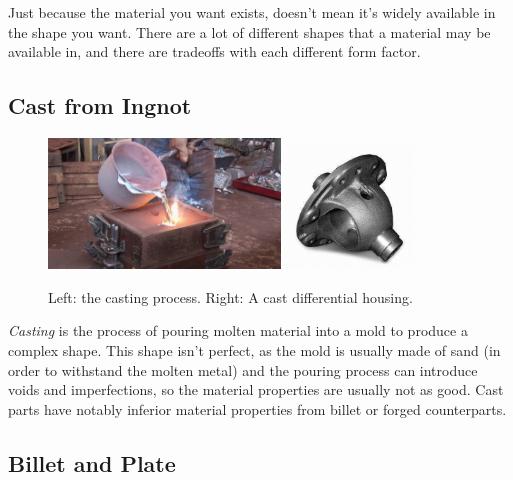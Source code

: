\documentclass[10pt,letterpaper]{book}
\begin{document}
 Just because the material you want exists, doesn't mean it's widely available in the shape you want. There are a lot of different shapes that a material may be available in, and there are tradeoffs with each different form factor.
 
 \subsection{Cast from Ingnot}
 
\begin{figure}[H]
	\includegraphics[width=0.55\textwidth]{imgs/casting_proc.jpeg}
	\qquad
	\includegraphics[width=0.3\textwidth]{imgs/casting_part.jpeg}
	\caption{Left: the casting process. Right: A cast differential housing.}
\end{figure} 
 \textit{Casting} is the process of pouring molten material into a mold to produce a complex shape. This shape isn't perfect, as the mold is usually made of sand (in order to withstand the molten metal) and the pouring process can introduce voids and imperfections, so the material properties are usually not as good. Cast parts have notably inferior material properties from billet or forged counterparts.
 
 \subsection{Billet and Plate}
 
\end{document}
